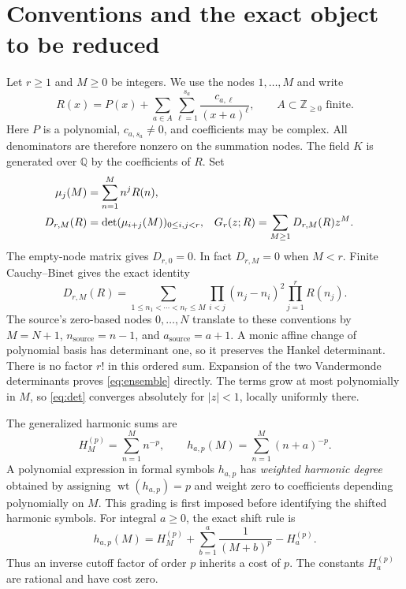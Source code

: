\documentclass[11pt,letterpaper]{article}
\numberwithin{equation}{section}
\theoremstyle{definition}\newtheorem{definition}[theorem]{Definition}
\theoremstyle{remark}\newtheorem{remark}[theorem]{Remark}
\newcommand{\Q}{\mathbb Q}\newcommand{\C}{\mathbb C}\newcommand{\N}{\mathbb N}\newcommand{\Z}{\mathbb Z}
\newcommand{\wt}{\operatorname{wt}}\newcommand{\Res}{\operatorname{Res}}
\begin{document}
\section{Conventions and the exact object to be reduced}

Let $r\ge1$ and $M\ge0$ be integers. We use the nodes $1,\ldots,M$ and
write
\begin{equation}\label{eq:R}
 R(x)=P(x)+\sum_{a\in A}\sum_{\ell=1}^{s_a}
                     \frac{c_{a,\ell}}{(x+a)^\ell},
 \qquad A\subset\Z_{\ge0}\text{ finite}.
\end{equation}
Here $P$ is a polynomial, $c_{a,s_a}\ne0$, and coefficients may be
complex. All denominators are therefore nonzero on the summation nodes.
The field $K$ is generated over $\Q$ by the coefficients of $R$.
Set
\begin{align}
 \mu_j(M)&=\sum_{n=1}^M n^j R(n),\notag\\
 D_{r,M}(R)&=\det(\mu_{i+j}(M))_{0\le i,j<r},
 &G_r(z;R)&=\sum_{M\ge1}D_{r,M}(R)z^M.
 \label{eq:det}
\end{align}
The empty-node matrix gives $D_{r,0}=0$. In fact $D_{r,M}=0$ when
$M<r$. Finite Cauchy--Binet gives the exact identity
\begin{equation}\label{eq:ensemble}
 D_{r,M}(R)=\sum_{1\le n_1<\cdots<n_r\le M}
             \prod_{i<j}(n_j-n_i)^2\prod_{j=1}^r R(n_j).
\end{equation}
The source's zero-based nodes $0,\ldots,N$ translate to these conventions
by $M=N+1$, $n_{\mathrm{source}}=n-1$, and
$a_{\mathrm{source}}=a+1$. A monic affine change of polynomial basis has
determinant one, so it preserves the Hankel determinant.
There is no factor $r!$ in this ordered sum. Expansion of the two
Vandermonde determinants proves \eqref{eq:ensemble} directly.
The terms grow at most polynomially in $M$, so \eqref{eq:det} converges
absolutely for $|z|<1$, locally uniformly there.

The generalized harmonic sums are
\begin{equation}\label{eq:h}
 H_M^{(p)}=\sum_{n=1}^M n^{-p},\qquad
 h_{a,p}(M)=\sum_{n=1}^M(n+a)^{-p}.
\end{equation}
A polynomial expression in formal symbols $h_{a,p}$ has
\emph{weighted harmonic degree} obtained by assigning
$\wt(h_{a,p})=p$ and weight zero to coefficients depending polynomially
on $M$. This grading is first imposed before identifying the shifted
harmonic symbols.
For integral $a\ge0$, the exact shift rule is
\begin{equation}\label{eq:shift}
 h_{a,p}(M)=H_M^{(p)}+
           \sum_{b=1}^a\frac1{(M+b)^p}-H_a^{(p)}.
\end{equation}
Thus an inverse cutoff factor of order $p$ inherits a cost of $p$.
The constants $H_a^{(p)}$ are rational and have cost zero.
\end{document}
